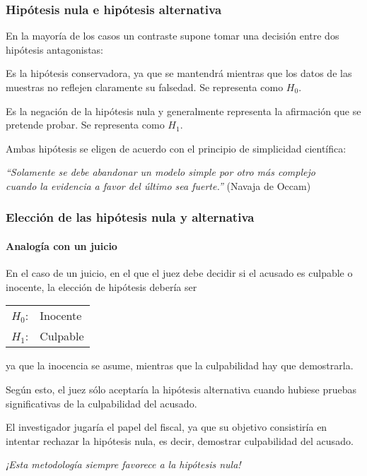 \begin{frame}
\frametitle{Hipótesis nula e hipótesis alternativa}
En la mayoría de los casos un contraste supone tomar una decisión entre dos hipótesis antagonistas:

\pause
\begin{description}[<+->]
\item[Hipótesis nula] Es la hipótesis conservadora, ya que se mantendrá mientras que los datos de las muestras
no reflejen claramente su falsedad. Se representa como $H_0$.
\item[Hipótesis alternativa] Es la negación de la hipótesis nula y generalmente representa la afirmación que se
pretende probar. Se representa como $H_1$.
\end{description}
\pause
Ambas hipótesis se eligen de acuerdo con el principio de simplicidad científica:
\begin{center}
\emph{``Solamente se debe abandonar un modelo simple por otro más complejo\\
cuando la evidencia a favor del último sea fuerte.''} (Navaja de Occam)
\end{center}
\end{frame}


\begin{frame}
\frametitle{Elección de las hipótesis nula y alternativa}
\framesubtitle{Analogía con un juicio}
En el caso de un juicio, en el que el juez debe decidir si el acusado es culpable o inocente, la elección de hipótesis debería ser
\pause
\begin{center}
\begin{tabular}{ll}
$H_0$: & Inocente\\
$H_1$: & Culpable
\end{tabular}
\end{center}
ya que la inocencia se asume, mientras que la culpabilidad hay que demostrarla.

\pause
Según esto, el juez sólo aceptaría la hipótesis alternativa cuando hubiese pruebas significativas de la culpabilidad del
acusado.

\pause
El investigador jugaría el papel del fiscal, ya que su objetivo consistiría en intentar rechazar la hipótesis
nula, es decir, demostrar culpabilidad del acusado.

\begin{center}
\emph{¡Esta metodología siempre favorece a la hipótesis nula!}
\end{center}
\end{frame}



